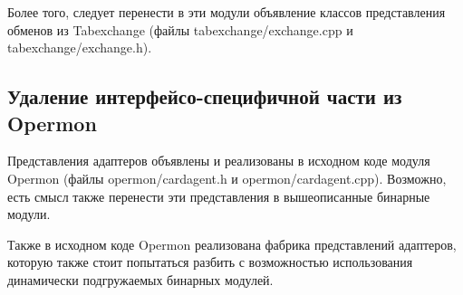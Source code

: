 Более того, следует перенести в эти модули объявление классов представления обменов из Tabexchange (файлы tabexchange/exchange.cpp и tabexchange/exchange.h).

\subsection{Удаление интерфейсо-специфичной части из Opermon}

Представления адаптеров объявлены и реализованы в исходном коде модуля Opermon (файлы opermon/cardagent.h и opermon/cardagent.cpp). Возможно, есть смысл также перенести эти представления в вышеописанные бинарные модули. 

Также в исходном коде Opermon реализована фабрика представлений адаптеров, которую также стоит попытаться разбить с возможностью использования динамически подгружаемых бинарных модулей.